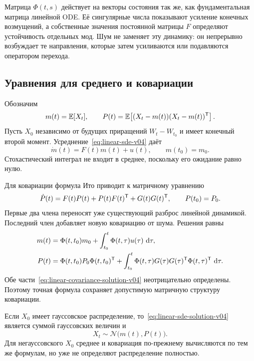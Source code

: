 \begin{connection}
Матрица $\Phi(t,s)$ действует на векторы состояния так же, как фундаментальная матрица линейной ODE. Её сингулярные числа показывают усиление конечных возмущений, а собственные значения постоянной матрицы $F$ определяют устойчивость отдельных мод. Шум не заменяет эту динамику: он непрерывно возбуждает те направления, которые затем усиливаются или подавляются оператором перехода.
\end{connection}

\subsection{Уравнения для среднего и ковариации}

Обозначим
\begin{equation}
\label{eq:mean-covariance-v04}
m(t)=\mathbb E[X_t],
\qquad
P(t)=\mathbb E\!\left[(X_t-m(t))(X_t-m(t))^{\mathsf{T}}\right].
\end{equation}
Пусть $X_0$ независимо от будущих приращений $W_t-W_{t_0}$ и имеет конечный второй момент. Усреднение~\eqref{eq:linear-sde-v04} даёт
\begin{equation}
\label{eq:linear-mean-ode-v04}
\dot m(t)=F(t)m(t)+u(t),
\qquad
m(t_0)=m_0.
\end{equation}
Стохастический интеграл не входит в среднее, поскольку его ожидание равно нулю.

Для ковариации формула Ито приводит к матричному уравнению
\begin{equation}
\label{eq:linear-covariance-ode-v04}
\dot P(t)
=
F(t)P(t)+P(t)F(t)^{\mathsf{T}}+G(t)G(t)^{\mathsf{T}},
\qquad
P(t_0)=P_0.
\end{equation}
Первые два члена переносят уже существующий разброс линейной динамикой. Последний член добавляет новую ковариацию от шума. Решения равны
\begin{align}
\label{eq:linear-mean-solution-v04}
m(t)
&=
\Phi(t,t_0)m_0
+
\int_{t_0}^{t}\Phi(t,\tau)u(\tau)\,\mathop{}\!\mathrm{d}\tau,
\\
\label{eq:linear-covariance-solution-v04}
P(t)
&=
\Phi(t,t_0)P_0\Phi(t,t_0)^{\mathsf{T}}
+
\int_{t_0}^{t}
\Phi(t,\tau)G(\tau)G(\tau)^{\mathsf{T}}
\Phi(t,\tau)^{\mathsf{T}}\,\mathop{}\!\mathrm{d}\tau.
\end{align}
Обе части~\eqref{eq:linear-covariance-solution-v04} неотрицательно определены. Поэтому точная формула сохраняет допустимую матричную структуру ковариации.

Если $X_0$ имеет гауссовское распределение, то~\eqref{eq:linear-sde-solution-v04} является суммой гауссовских величин и
\begin{equation}
\label{eq:linear-gaussian-law-v04}
X_t\sim\mathcal N\bigl(m(t),P(t)\bigr).
\end{equation}
Для негауссовского $X_0$ среднее и ковариация по-прежнему вычисляются по тем же формулам, но уже не определяют распределение полностью.


